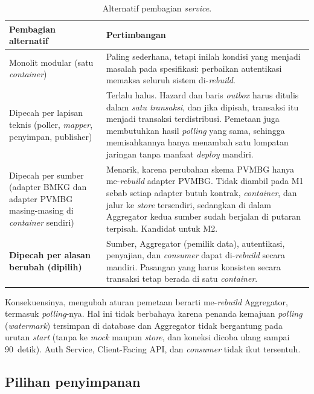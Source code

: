 \begin{table}[H]
\centering\small
\begin{tabularx}{\textwidth}{@{}L{3.9cm}Y@{}}
\toprule
\textbf{Pembagian alternatif} & \textbf{Pertimbangan}\\
\midrule
Monolit modular (satu \emph{container}) & Paling sederhana, tetapi inilah kondisi yang menjadi masalah pada spesifikasi: perbaikan autentikasi memaksa seluruh sistem di-\emph{rebuild}.\\
Dipecah per lapisan teknis (poller, \emph{mapper}, penyimpan, publisher) & Terlalu halus. Hazard dan baris \emph{outbox} harus ditulis dalam \emph{satu transaksi}, dan jika dipisah, transaksi itu menjadi transaksi terdistribusi. Pemetaan juga membutuhkan hasil \emph{polling} yang sama, sehingga memisahkannya hanya menambah satu lompatan jaringan tanpa manfaat \emph{deploy} mandiri.\\
Dipecah per sumber (adapter BMKG dan adapter PVMBG masing-masing di \emph{container} sendiri) & Menarik, karena perubahan skema PVMBG hanya me-\emph{rebuild} adapter PVMBG. Tidak diambil pada M1 sebab setiap adapter butuh kontrak, \emph{container}, dan jalur ke \emph{store} tersendiri, sedangkan di dalam Aggregator kedua sumber sudah berjalan di putaran terpisah. Kandidat untuk M2.\\
\textbf{Dipecah per alasan berubah (dipilih)} & Sumber, Aggregator (pemilik data), autentikasi, penyajian, dan \emph{consumer} dapat di-\emph{rebuild} secara mandiri. Pasangan yang harus konsisten secara transaksi tetap berada di satu \emph{container}.\\
\bottomrule
\end{tabularx}
\caption{Alternatif pembagian \emph{service}.}
\end{table}

Konsekuensinya, mengubah aturan pemetaan berarti me-\emph{rebuild} Aggregator, termasuk \emph{polling}-nya. Hal ini tidak berbahaya
karena penanda kemajuan \emph{polling} (\emph{watermark}) tersimpan di database dan Aggregator tidak bergantung pada urutan
\emph{start} (tanpa  ke \emph{mock} maupun \emph{store}, dan koneksi dicoba ulang sampai 90~detik). Auth Service,
Client-Facing API, dan \emph{consumer} tidak ikut tersentuh.

\subsection{Pilihan penyimpanan}\label{sec:p4-storage}

